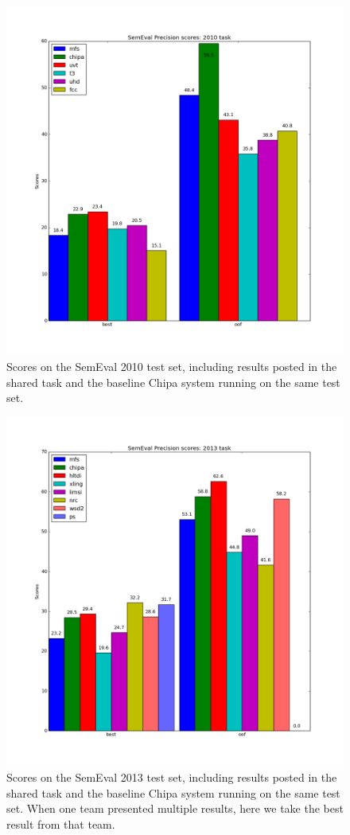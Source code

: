 \begin{figure}
  \includegraphics[width=\textwidth]{semeval-2010-ch4.png}
  \caption{Scores on the SemEval 2010 test set, including results posted in
  the shared task and the baseline Chipa system running on the same test set.}
  \label{fig:semeval2010:baseline}
\end{figure}

\begin{figure}
  \includegraphics[width=\textwidth]{semeval-2013-ch4.png}
  \caption{Scores on the SemEval 2013 test set, including results posted in
  the shared task and the baseline Chipa system running on the same test set.
  When one team presented multiple results, here we take the best result from
  that team.}
  \label{fig:semeval2013:baseline}
\end{figure}

